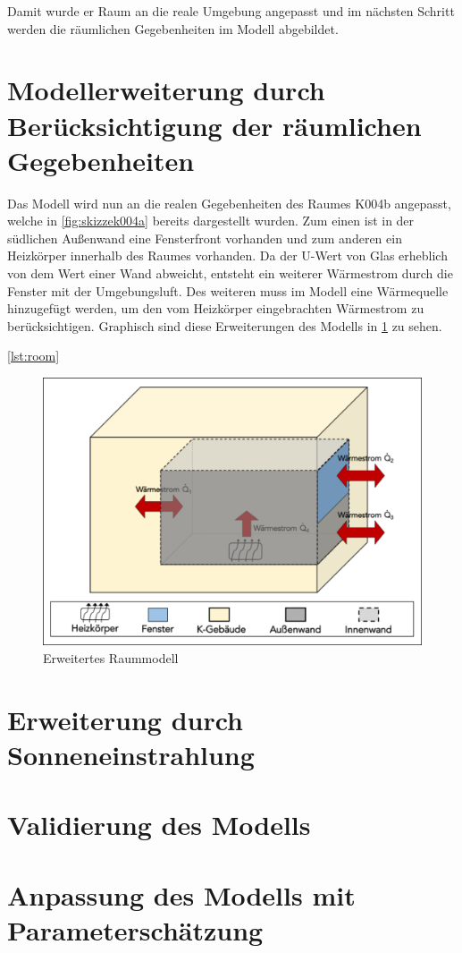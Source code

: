 Damit wurde er Raum an die reale Umgebung angepasst und im nächsten Schritt werden die räumlichen Gegebenheiten im Modell abgebildet.

\section{Modellerweiterung durch Berücksichtigung der räumlichen Gegebenheiten}

Das Modell wird nun an die realen Gegebenheiten des Raumes K004b angepasst, welche in \ref{fig:skizzek004a} bereits dargestellt wurden. Zum einen ist in der südlichen Außenwand eine Fensterfront vorhanden und zum anderen ein Heizkörper innerhalb des Raumes vorhanden. Da der U-Wert von Glas erheblich von dem Wert einer Wand abweicht, entsteht ein weiterer Wärmestrom durch die Fenster mit der Umgebungsluft. Des weiteren muss im Modell eine Wärmequelle hinzugefügt werden, um den vom Heizkörper eingebrachten Wärmestrom zu berücksichtigen. Graphisch sind diese Erweiterungen des Modells in \ref{fig:raumeins} zu sehen.


\ref{lst:room}

\begin{figure}
\centering
\includegraphics[width=\textwidth]{abbildungen/20160316_raumeins}
\caption{Erweitertes Raummodell}
\label{fig:raumeins}
\end{figure}



\section{Erweiterung durch Sonneneinstrahlung}

\section{Validierung des Modells}

\section{Anpassung des Modells mit Parameterschätzung}
